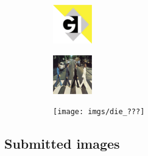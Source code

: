 \begin{figure}[!h]
\begin{subfigure}{.19\linewidth}
\end{subfigure}
\begin{subfigure}{.19\linewidth}
  \centering
  \includegraphics[width=0.7\linewidth]{imgs/gi}
\end{subfigure}
\begin{subfigure}{.19\linewidth}
  \centering
  \includegraphics[width=0.7\linewidth]{imgs/abbey}
\end{subfigure}
\begin{subfigure}{.19\linewidth}
  \centering
  \texttt{[image: imgs/die\_???]}
\end{subfigure}
\end{figure}

\subsection{Submitted images}

